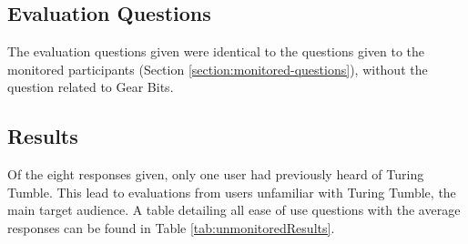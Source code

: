 \documentclass{l4proj}
\begin{document}
\subsection{Evaluation Questions}
The evaluation questions given were identical to the questions given to the monitored participants (Section \ref{section:monitored-questions}), without the question related to Gear Bits.   

\subsection{Results}
Of the eight responses given, only one user had previously heard of Turing Tumble. This lead to evaluations from users unfamiliar with Turing Tumble, the main target audience. A table detailing all ease of use questions with the average responses can be found in Table \ref{tab:unmonitoredResults}. 
\end{document}
